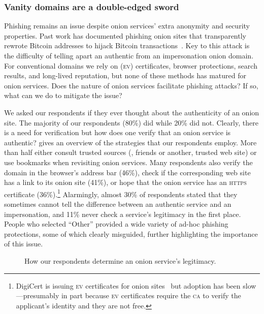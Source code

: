\subsubsection{Vanity domains are a double-edged sword}

Phishing remains an issue despite onion services' extra anonymity and security
properties.  Past work has documented phishing onion sites that transparently
rewrote Bitcoin addresses to hijack Bitcoin
transactions~\cite{Winter2016a,Nurmi2015a,Monteiro2016a}.  Key to this attack is
the difficulty of telling apart an authentic from an impersonation onion domain.
For conventional domains we rely on (\textsc{ev}) certificates, browser
protections, search results, and long-lived reputation, but none of these
methods has matured for onion services.  Does the nature of onion services
facilitate phishing attacks?  If so, what can we do to mitigate the issue?

We asked our respondents if they ever thought about the authenticity of an onion
site.  The majority of our respondents (80\%) did while 20\% did not.  Clearly,
there is a need for verification but how does one verify that an onion service
is authentic?   gives an overview of the
strategies that our respondents employ.  More than half either consult trusted
sources (\eg, friends or another, trusted web site) or use bookmarks when
revisiting onion services.  Many respondents also verify the domain in the
browser's address bar (46\%), check if the corresponding web site has a link to
its onion site (41\%), or hope that the onion service has an \textsc{https}
certificate (36\%).\footnote{DigiCert is issuing \textsc{ev} certificates for
onion sites~\cite{DigiCert2015a} but adoption has been slow---presumably in part
because \textsc{ev} certificates require the \textsc{ca} to verify the
applicant's identity and they are not free.}  Alarmingly, almost 30\% of
respondents stated that they sometimes cannot tell the difference between an
authentic service and an impersonation, and 11\% never check a service's
legitimacy in the first place.  People who selected ``Other'' provided a wide
variety of ad-hoc phishing protections, some of which clearly misguided, further
highlighting the importance of this issue.

\begin{figure}[t]
    \centering
    
    \caption{How our respondents determine an onion service's legitimacy.}
    \label{fig:determining-legitimacy}
\end{figure}

